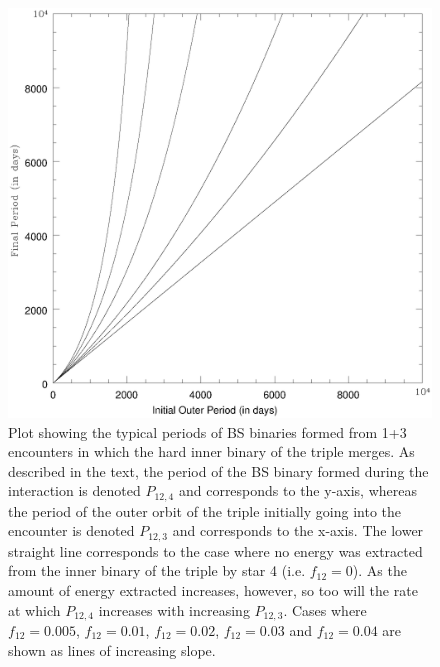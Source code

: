 \begin{enumerate}
\begin{figure} [!h]
  \begin{center}
 \includegraphics[scale=0.5]{Chapter-2/fig2.eps}
   \caption[Plot showing the typical periods of BS binaries expected to
form during 1+3 encounters in which the hard inner binary of the
triple merges]{Plot showing the typical periods of BS binaries
  formed from 1+3 encounters in which the hard inner binary of the
  triple merges.  As described in the text, the period of the BS binary
  formed during the interaction is denoted $P_{12,4}$ and corresponds
  to the y-axis, whereas the period of the outer orbit of the triple
  initially going into the encounter is denoted $P_{12,3}$ and
  corresponds to the x-axis.  The lower straight line 
  corresponds to the case where no energy was extracted from the inner
  binary of the triple by star 4 (i.e. $f_{12}=0$).  As the amount of
  energy extracted increases, however, so too will the 
  rate at which $P_{12,4}$ increases with increasing $P_{12,3}$.
  Cases where $f_{12}=0.005$, $f_{12}=0.01$, $f_{12}=0.02$,
  $f_{12}=0.03$ and $f_{12}=0.04$ are shown as lines of increasing
  slope.
   \label{fig:sintri}}
  \end{center}
\end{figure}


\end{enumerate}
